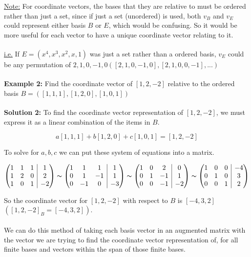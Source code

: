 \documentclass[12pt]{article}
\makeatletter
\newenvironment{amatrix}[1]{%
  \left(\begin{array}{@{}*{#1}{c}|c@{}}
}{%
  \end{array}\right)
}
\makeatother
\begin{document}
\underline{Note:} For coordinate vectors, the bases that they are relative to must be ordered rather than just a set, since if just a set (unordered) is used, both $v_B$ and $v_E$ could represent either basis $B$ or $E$, which would be confusing. So it would be more useful for each vector to have a unique coordinate vector relating to it.\\
\\
\underline{i.e.} If $E = (x^4, x^3, x^2, x, 1)$ was just a set rather than a ordered basis, $v_E$ could be any permutation of $2,1,0,-1,0 ([2,1,0,-1,0], [2,1,0,0,-1],...)$\\
\\
\textbf{Example 2:} Find the coordinate vector of $[1,2,-2]$ relative to the ordered basis $B = ([1,1,1], [1,2,0], [1,0,1])$\\
\\
\textbf{Solution 2:} To find the coordinate vector representation of $[1,2,-2]$, we must express it as a linear combination of the items in $B$.

$$a[1,1,1] + b[1,2,0] + c[1,0,1] = [1,2,-2]$$

To solve for $a,b,c$ we can put these system of equations into a matrix.

$$
\begin{amatrix}{3}
1 & 1 & 1 & 1 \\
1 & 2 & 0 & 2 \\
1 & 0 & 1 & -2
\end{amatrix} 
\thicksim
\begin{amatrix}{3}
1 & 1 & 1 & 1 \\
0 & 1 & -1 & 1 \\
0 & -1 & 0 & -3
\end{amatrix} 
\thicksim
\begin{amatrix}{3}
1 & 0 & 2 & 0 \\
0 & 1 & -1 & 1 \\
0 & 0 & -1 & -2
\end{amatrix}
\thicksim
\begin{amatrix}{3}
1 & 0 & 0 & -4 \\
0 & 1 & 0 & 3 \\
0 & 0 & 1 & 2
\end{amatrix}
$$

So the coordinate vector for $[1,2,-2]$ with respect to $B$ is $[-4,3,2]$ $([1,2,-2]_B = [-4,3,2])$.\\
\\
We can do this method of taking each basis vector in an augmented matrix with the vector we are trying to find the coordinate vector representation of, for all finite bases and vectors within the span of those finite bases.
\end{document}
